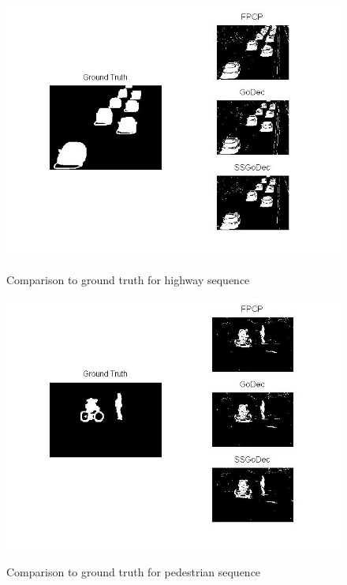 \documentclass[conference]{IEEEtran}
\begin{document}
\begin{figure}[H] 
\begin{center} 
\noindent
  \includegraphics[width=.8\columnwidth]{highway} 
  \caption{Comparison to ground truth for highway sequence} \label{fig:output1_1}
  \noindent
  \includegraphics[width=.8\columnwidth]{pedestrians}
  \caption{Comparison to ground truth for pedestrian sequence}  \label{fig:output1_2}
\end{center}
\end{figure}
\end{document}
